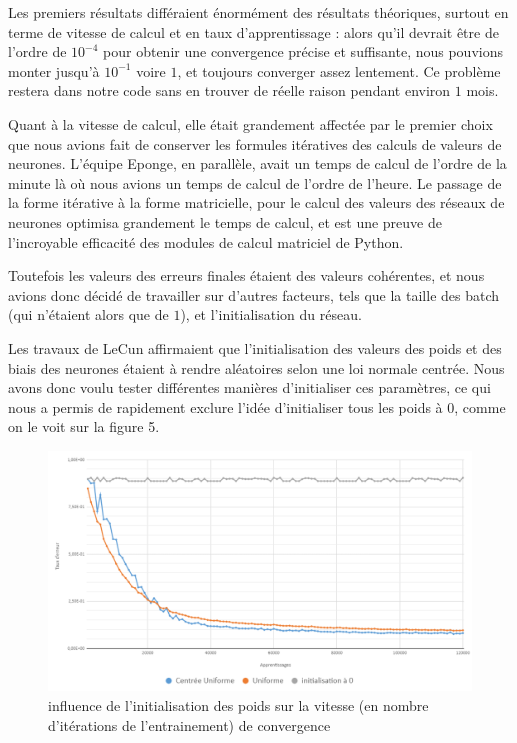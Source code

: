 \documentclass[
    10pt,
    a4paper,
    oneside,
    headinclude,footinclude,
    BCOR=5mm,
    captions=tableabove
]{scrartcl}
\begin{document}
Les premiers résultats différaient énormément des résultats théoriques, surtout en terme de vitesse de calcul et en taux d'apprentissage : alors qu'il devrait être de l'ordre de $10^{-4}$ pour obtenir une convergence précise et suffisante, nous pouvions monter jusqu'à $10^{-1}$ voire $1$, et toujours converger assez lentement. Ce problème restera dans notre code sans en trouver de réelle raison pendant environ $1$ mois.

Quant à la vitesse de calcul, elle était grandement affectée par le premier choix que nous avions fait de conserver les formules itératives des calculs de valeurs de neurones. L'équipe Eponge, en parallèle, avait un temps de calcul de l'ordre de la minute là où nous avions un temps de calcul de l'ordre de l'heure. Le passage de la forme itérative à la forme matricielle, pour le calcul des valeurs des réseaux de neurones optimisa grandement le temps de calcul, et est une preuve de l'incroyable efficacité des modules de calcul matriciel de Python. 

Toutefois les valeurs des erreurs finales étaient des valeurs cohérentes, et nous avions donc décidé de travailler sur d'autres facteurs, tels que la taille des batch (qui n'étaient alors que de $1$), et l'initialisation du réseau.

Les travaux de LeCun affirmaient que l'initialisation des valeurs des poids et des biais des neurones étaient à rendre aléatoires selon une loi normale centrée. Nous avons donc voulu tester différentes manières d'initialiser ces paramètres, ce qui nous a permis de rapidement exclure l'idée d'initialiser tous les poids à $0$, comme on le voit sur la figure 5. 
\vspace{35mm}

\begin{figure}[h!]
\includegraphics[width=\linewidth]{initPoids.png}
\centering
 \caption{influence de l'initialisation des poids sur la vitesse (en nombre d'itérations de l'entrainement) de convergence }
 \label{fig:initPoids.png}
\end{figure}
\end{document}

